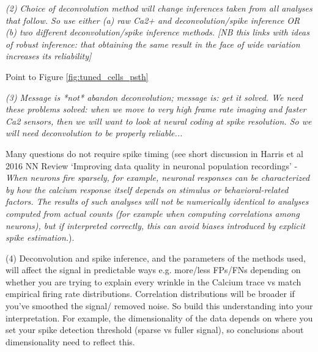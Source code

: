 \documentclass[a4paper,10pt,twocolumn]{article}
\begin{document}
\emph{(2) Choice of deconvolution method will change inferences taken from all analyses that follow. So use either (a) raw Ca2+ and deconvolution/spike inference OR (b) two different deconvolution/spike inference methods. [NB this links with ideas of robust inference: that obtaining the same result in the face of wide variation increases its reliability]}

Point to Figure \ref{fig:tuned_cells_psth}

\emph{(3) Message is *not* abandon deconvolution; message is: get it solved. We need these problems solved: when we move to very high frame rate imaging and faster Ca2 sensors, then we will want to look at neural coding at spike resolution. So we will need deconvolution to be properly reliable...}

Many questions do not require spike timing (see short discussion in Harris et al 2016 NN Review `Improving data quality in neuronal population recordings' - \emph{When neurons fire sparsely, for example, neuronal responses can be characterized by how the calcium response itself depends on stimulus or behavioral-related factors. The results of such analyses will not be numerically identical to analyses computed from actual counts (for example when computing correlations among neurons), but if interpreted correctly, this can avoid biases introduced by explicit spike estimation.}). 

(4) Deconvolution and spike inference, and the parameters of the methods used, will affect the signal in predictable ways e.g. more/less FPs/FNs depending on whether you are trying to explain every wrinkle in the Calcium trace vs match empirical firing rate distributions. Correlation distributions will be broader if you've smoothed the signal/ removed noise. So build this understanding into your interpretation.
For example, the dimensionality of the data depends on where you set your spike detection threshold (sparse vs fuller signal), so conclusions about dimensionality need to reflect this.
\end{document}
